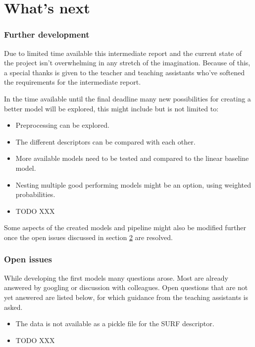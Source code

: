 \part{What's next}
\label{part:whats_next}


\section{Further development}
\label{section:further_development}

Due to limited time available this intermediate report and the current state of the project isn't overwhelming in any stretch of the imagination.
Because of this, a special thanks is given to the teacher and teaching assistants who've softened the requirements for the intermediate report.

In the time available until the final deadline many new possibilities for creating a better model will be explored, this might include but is not limited to:
\begin{itemize}
    \item Preprocessing can be explored.
    \item The different descriptors can be compared with each other.
    \item More available models need to be tested and compared to the linear baseline model.
    \item Nesting multiple good performing models might be an option, using weighted probabilities.
    \item TODO XXX
\end{itemize}

Some aspects of the created models and pipeline might also be modified further once the open issues discussed in section \ref{section:open_issues} are resolved.


\section{Open issues}
\label{section:open_issues}

While developing the first models many questions arose. Most are already answered by googling or discussion with colleagues. Open questions that are not yet answered are listed below, for which guidance from the teaching assistants is asked.

\begin{itemize}
    \item The data is not available as a pickle file for the SURF descriptor.
    \item TODO XXX
\end{itemize}
